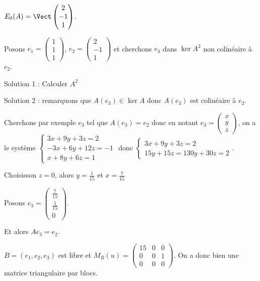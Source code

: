 \begin{exemple}
    $E_0(A) = \Vect \begin{pmatrix}
        2 \\ -1 \\ 1
    \end{pmatrix}$.

    Posons $e_1 = \begin{pmatrix}
        1 \\ 1 \\ 1
    \end{pmatrix}$, $e_2 = \begin{pmatrix}
        2 \\ -1 \\ 1
    \end{pmatrix}$ et cherchons $e_3$ dans $\ker A^2$ non colinéaire à $e_2$.

    \avspace Solution 1 : Calculer $A^2$ 

    \avspace Solution 2 : remarquons que $A(e_3) \in \ker A$ donc $A(e_3) $ est colinéaire à $e_2$.

    Cherchons par exemple $e_3$ tel que $A(e_3) = e_2$ donc en notant $e_3 = \begin{pmatrix}
        x \\ y \\ z
    \end{pmatrix}$, on a le système
    $\begin{cases}
        3x + 9y + 3z = 2 \\
        -3x + 6y + 12z = -1 \\
        x + 8y + 6z = 1
    \end{cases}$ donc $\begin{cases}
        3x + 9y + 3z = 2 \\
        15 y + 15 z = 1 
        30 y + 30 z = 2
    \end{cases}$. 
    
    Choisisson $z = 0$, alors $y = \frac{1}{15}$ et $x = \frac{7}{15}$

    Posons $e_3 = \begin{pmatrix}
        \frac{7}{15} \\ \frac{1}{15} \\ 0
    \end{pmatrix}$.

    Et alors $A e_3 = e_2$.

    $B = (e_1, e_2, e_3)$ est libre et $M_B(u) = \begin{pmatrix}
        15 & 0 & 0 \\
        0 & 0 & 1 \\
        0 & 0 & 0
    \end{pmatrix}$. On a donc bien une matrice triangulaire par blocs. 
\end{exemple}

